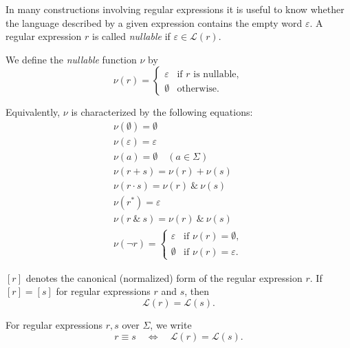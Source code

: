 \begin{definition}\label{def:nullable}
In many constructions involving regular expressions it is useful to know
whether the language described by a given expression contains the empty word
$\varepsilon$. A regular expression $r$ is called \emph{nullable} if
$\varepsilon \in \mathcal{L}(r)$.

We define the \emph{nullable} function $\nu$ by
\[
\nu(r) =
\begin{cases}
  \varepsilon & \text{if $r$ is nullable},\\
  \emptyset   & \text{otherwise}.
\end{cases}
\]

Equivalently, $\nu$ is characterized by the following equations:
\[
\begin{array}{c}
     \nu(\emptyset)=\emptyset \\[1ex]
     \nu(\varepsilon)=\varepsilon  \\[1ex]
     \nu(a)=\emptyset \quad (a \in \Sigma) \\[1ex]
     \nu(r+s) = \nu(r) + \nu(s) \\[1ex]
     \nu(r\cdot s)=\nu(r)\: \& \: \nu(s) \\[1ex]
     \nu(r^*) = \varepsilon \\[1ex]
     \nu(r\:\&\:s) = \nu(r) \: \& \: \nu(s) \\[1ex]
     \nu(\neg r)= 
     \begin{cases}
         \varepsilon & \text{if } \nu(r) = \emptyset, \\
         \emptyset   & \text{if } \nu(r) = \varepsilon.
     \end{cases}
\end{array}
\]
\end{definition}

\begin{definition}\label{def:canonical-form}
 $[r]$ denotes the canonical (normalized) form
of the regular expression $r$.
If $[r] = [s]$ for regular expressions $r$ and $s$, then
\[
  \mathcal{L}(r) = \mathcal{L}(s).
\]
\end{definition}

\begin{definition}\label{def:semantic-equivalence}
For regular expressions $r,s$ over $\Sigma$, we write
\[
  r \equiv s \quad\Longleftrightarrow\quad \mathcal{L}(r)=\mathcal{L}(s).
\]
\end{definition}

